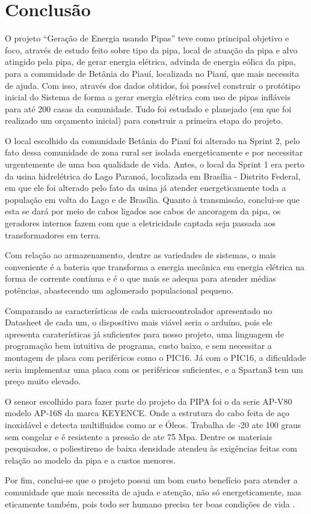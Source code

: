 \chapter[Conclusão]{Conclusão}

O projeto “Geração de Energia usando Pipas” teve como principal objetivo e foco, através de estudo feito sobre tipo da pipa, local de atuação da pipa e alvo atingido pela pipa, de gerar energia elétrica, advinda de energia eólica da pipa, para a comunidade de Betânia do Piauí, localizada no Piauí, que mais necessita de ajuda. Com isso, através dos dados obtidos, foi possível construir o protótipo inicial do Sistema de forma a gerar energia elétrica com uso de pipas infláveis para até 200 casas da comunidade. Tudo foi estudado e planejado (em que foi realizado um orçamento inicial) para construir a primeira etapa do projeto.

O local escolhido da comunidade Betânia do Piauí foi alterado na Sprint 2, pelo fato dessa comunidade de zona rural ser isolada energeticamente e por necessitar urgentemente de uma boa qualidade de vida. Antes, o local da Sprint 1 era perto da usina hidrelétrica do Lago Paranoá, localizada em Brasília - Distrito Federal, em que ele foi alterado pelo fato da usina já atender energeticamente toda a população em volta do Lago e de Brasília.
Quanto à transmissão, conclui-se que esta se dará por meio de cabos ligados aos cabos de ancoragem da pipa, os geradores internos fazem com que a eletricidade captada seja passada aos transformadores em terra.

Com relação ao armazenamento, dentre as variedades de sistemas, o mais conveniente é a bateria que transforma a energia mecânica em energia elétrica na forma de corrente contínua e é o que mais se adequa para atender médias potências, abastecendo um aglomerado populacional pequeno.

Comparando as características de cada microcontrolador apresentado no Datasheet de cada um, o dispositivo mais viável seria o arduíno, pois ele apresenta caraterísticas já suficientes para nosso projeto, uma linguagem de programação bem intuitiva de programa, custo baixo, e sem necessitar a montagem de placa com periféricos como o PIC16. Já com o PIC16, a dificuldade seria implementar uma placa com os periféricos suficientes, e a Spartan3 tem um preço muito elevado.

O sensor escolhido para fazer parte do projeto da PIPA foi o da serie AP-V80 modelo AP-16S da marca KEYENCE. Onde a estrutura do cabo feita de aço inoxidável e detecta multifluidos como ar e Óleos. Trabalha de -20 ate 100 graus sem congelar e é resistente a pressão de ate 75 Mpa.
Dentre os materiais pesquisados, o poliestireno de baixa densidade atendeu às exigências feitas com relação ao modelo da pipa e a custos menores.

Por fim, conclui-se que o projeto possui um bom custo benefício para atender a comunidade que mais necessita de ajuda e atenção, não só energeticamente, mas eticamente também, pois todo ser humano precisa ter boas condições de vida .